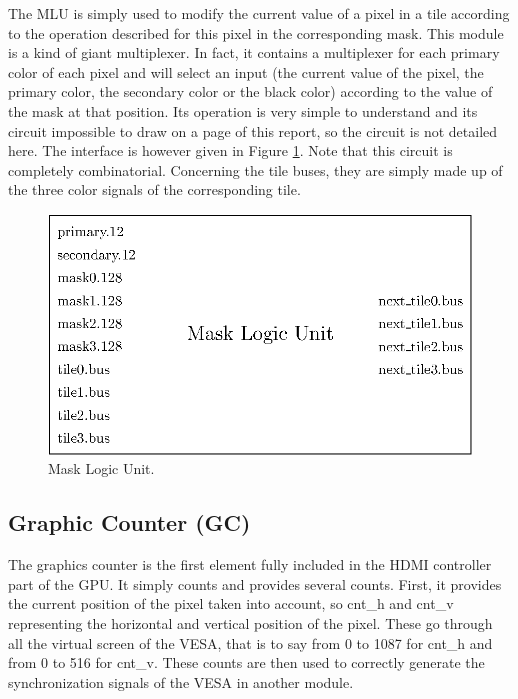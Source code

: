 The MLU is simply used to modify the current value of a pixel in a tile according to the operation 
described for this pixel in the corresponding mask. This module is a kind of giant multiplexer. In 
fact, it contains a multiplexer for each primary color of each pixel and will select an input 
(the current value of the pixel, the primary color, the secondary color or the black color) 
according to the value of the mask at that position. Its operation is very simple to understand 
and its circuit impossible to draw on a page of this report, so the circuit is not detailed here. The interface is however given in Figure \ref{fig:gpu/mlu}.
Note that this circuit is completely combinatorial. Concerning the tile buses, they are simply
made up of the three color signals of the corresponding tile.

\begin{figure}[H]
    \centering
    \includegraphics[scale=1.0]{Chapter4-GPU_CLKU/res/mlu}
    \caption{Mask Logic Unit.}
    \label{fig:gpu/mlu}
\end{figure}

\subsection{Graphic Counter (GC)}

The graphics counter is the first element fully included in the HDMI controller part of the GPU. 
It simply counts and provides several counts. First, it provides the current position of the 
pixel taken into account, so cnt\_h and cnt\_v representing the horizontal and vertical position 
of the pixel. These go through all the virtual screen of the VESA, that is to say from 0 to 1087 
for cnt\_h and from 0 to 516 for cnt\_v. These counts are then used to correctly generate the 
synchronization signals of the VESA in another module. 


